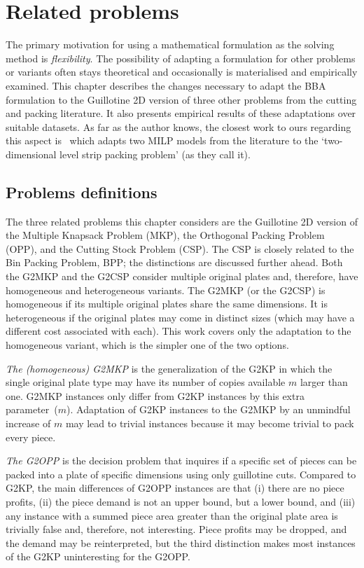 \chapter{Related problems}
\label{sec:other_problems}

The primary motivation for using a mathematical formulation as the solving method is \emph{flexibility}.
The possibility of adapting a formulation for other problems or variants often stays theoretical and occasionally is materialised and empirically examined.
This chapter describes the changes necessary to adapt the BBA formulation to the Guillotine 2D version of three other problems from the cutting and packing literature.
It also presents empirical results of these adaptations over suitable datasets.
As far as the author knows, the closest work to ours regarding this aspect is~\citet{bezerra:2020} which adapts two MILP models from the literature to the `two-dimensional level strip packing problem' (as they call it).

\section{Problems definitions}

The three related problems this chapter considers are the Guillotine 2D version of the Multiple Knapsack Problem (MKP), the Orthogonal Packing Problem (OPP), and the Cutting Stock Problem (CSP).
The CSP is closely related to the Bin Packing Problem, BPP; the distinctions are discussed further ahead.
Both the G2MKP and the G2CSP consider multiple original plates and, therefore, have homogeneous and heterogeneous variants.
The G2MKP (or the G2CSP) is homogeneous if its multiple original plates share the same dimensions.
It is heterogeneous if the original plates may come in distinct sizes (which may have a different cost associated with each).
 This work covers only the adaptation to the homogeneous variant, which is the simpler one of the two options.

\emph{The (homogeneous) G2MKP} is the generalization of the G2KP in which the single original plate type may have its number of copies available \(m\) larger than one.
G2MKP instances only differ from G2KP instances by this extra parameter~(\(m\)).
Adaptation of G2KP instances to the G2MKP by an unmindful increase of \(m\) may lead to trivial instances because it may become trivial to pack every piece.

\emph{The G2OPP} is the decision problem that inquires if a specific set of pieces can be packed into a plate of specific dimensions using only guillotine cuts.
Compared to G2KP, the main differences of G2OPP instances are that (i) there are no piece profits, (ii) the piece demand is not an upper bound, but a lower bound, and (iii) any instance with a summed piece area greater than the original plate area is trivially false and, therefore, not interesting.
Piece profits may be dropped, and the demand may be reinterpreted, but the third distinction makes most instances of the G2KP uninteresting for the G2OPP.

